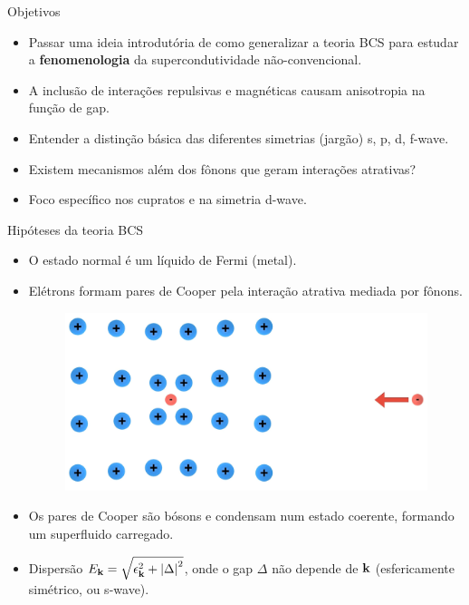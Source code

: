 \documentclass[8pt,aspectratio=169,xcolor={table,dvipsnames,usenames}]{beamer}
\begin{document}

\begin{frame}{Objetivos}

\begin{itemize}
\item Passar uma ideia introdutória de como generalizar a teoria BCS para estudar a \textbf{fenomenologia} da supercondutividade não-convencional.

\n\n

\item A inclusão de interações repulsivas e magnéticas causam anisotropia na função de gap.

\n\n

\item Entender a distinção básica das diferentes simetrias (jargão) s, p, d, f-wave.

\n\n

\item Existem mecanismos além dos fônons que geram interações atrativas?

\n\n

\item Foco específico nos cupratos e na simetria d-wave.
\end{itemize}



\end{frame}

\begin{frame}{Hipóteses da teoria BCS}

\begin{itemize}
\item O estado normal é um líquido de Fermi (metal).

\item Elétrons formam pares de Cooper pela interação atrativa mediada por fônons.

\n

\begin{figure}[H]
\centering
\includegraphics[width=0.5\linewidth]{fig/phonon.png}
\label{fig:phonon}
\end{figure}

\n

\item Os pares de Cooper são bósons e condensam num estado coerente, formando um superfluido carregado.

\item Dispersão $E_{\vb{k}} = \sqrt{\epsilon_{\vb{k}}^2 + \abs{\Delta}^2}$, onde o gap $\Delta$ não depende de $\vb{k}$ (esfericamente simétrico, ou s-wave).
\end{itemize}

\end{frame}
\end{document}
